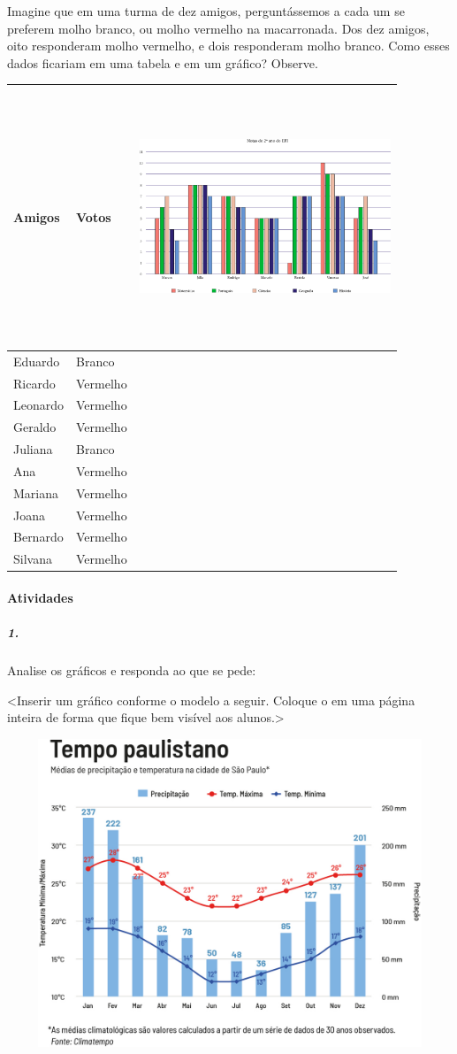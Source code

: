 Imagine que em uma turma de dez amigos, perguntássemos a cada um se
preferem molho branco, ou molho vermelho na macarronada. Dos dez amigos,
oito responderam molho vermelho, e dois responderam molho branco. Como
esses dados ficariam em uma tabela e em um gráfico? Observe.

\begin{longtable}[]{@{}lll@{}}
\toprule
Amigos & Votos &
\includegraphics[width=2.95833in,height=3.00000in]{media/image90.png}\tabularnewline
\midrule
\endhead
Eduardo & Branco &\tabularnewline
Ricardo & Vermelho &\tabularnewline
Leonardo & Vermelho &\tabularnewline
Geraldo & Vermelho &\tabularnewline
Juliana & Branco &\tabularnewline
Ana & Vermelho &\tabularnewline
Mariana & Vermelho &\tabularnewline
Joana & Vermelho &\tabularnewline
Bernardo & Vermelho &\tabularnewline
Silvana & Vermelho &\tabularnewline
\bottomrule
\end{longtable}

\paragraph{Atividades }\label{atividades-6}

\subparagraph{1.}\label{section-78}

Analise os gráficos e responda ao que se pede:

\textless{}Inserir um gráfico conforme o modelo a seguir. Coloque o em
uma página inteira de forma que fique bem visível aos
alunos.\textgreater{}

\includegraphics[width=7.80208in,height=3.62472in]{media/image91.png}

